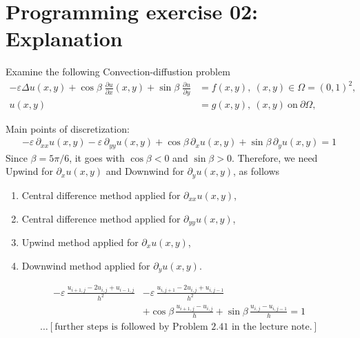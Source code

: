 \documentclass[12pt]{article}
\begin{document}
\section{Programming exercise 02: Explanation}
\begin{example}
	Examine the following Convection-diffustion problem
	\begin{align*}
		-\varepsilon\Delta u(x,y)
		+ \cos\beta\;\frac{\partial u}{\partial x}(x,y)
		+ \sin\beta\;\frac{\partial u}{\partial y}
		       & = f(x,y), \ (x,y) \in \Omega = (0,1)^2,          \\
		u(x,y) & = g(x,y), \ (x,y) \ \text{on} \ \partial \Omega,
	\end{align*}
\end{example}
Main points of discretization:
\begin{align*}
	-\varepsilon\,  \partial_{xx} u(x,y)
	-\varepsilon\,  \partial_{yy} u(x,y)
	+\cos\beta\, \partial_{x} u(x,y)
	+\sin\beta\, \partial_{y} u(x,y) = 1
\end{align*}
Since $\beta = 5\pi/6$, it goes with $\cos\beta < 0$ and $\sin\beta > 0$.
Therefore, we need 
Upwind for $\partial_{x} u(x,y)$ and 
Downwind for $\partial_{y} u(x,y)$, 
as follows
\begin{enumerate}
	\item Central difference method applied for $\partial_{xx} u(x,y)$,
	\item Central difference method applied for $\partial_{yy} u(x,y)$,
	\item Upwind method applied for $\partial_{x} u(x,y)$,
	\item Downwind method applied for $\partial_{y} u(x,y)$.
\end{enumerate}
\begin{align*}
	-\varepsilon\,\frac{u_{i+1,j}-2u_{i,j}+u_{i-1,j}}{h^2}
	 & -\varepsilon\,\frac{u_{i,j+1}-2u_{i,j}+u_{i,j-1}}{h^2} \\
	 & +\cos\beta\,\frac{u_{i+1,j}-u_{i,j}}{h}
	+\sin\beta\,\frac{u_{i,j}-u_{i,j-1}}{h}
	=1
\end{align*}
\begin{align*}
	\dots
	[\text{further steps is followed by Problem 2.41 in the lecture note.}]
\end{align*}
\newpage
\end{document}
